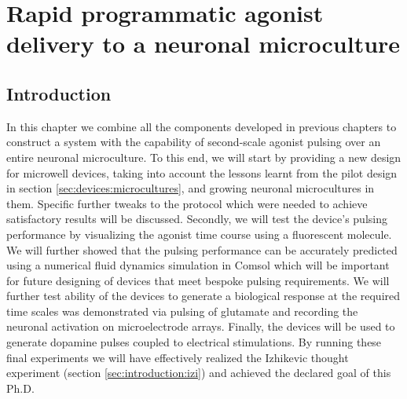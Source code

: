 \chapter{Rapid programmatic agonist delivery to a neuronal microculture}
\label{chap:microculturePulses}
\section{Introduction}
In this chapter we combine all the components developed in previous chapters to construct a system with the capability of second-scale agonist pulsing over an entire neuronal microculture. To this end, we will start by providing a new design for microwell devices, taking into account the lessons learnt from the pilot design in section \ref{sec:devices:microcultures}, and growing neuronal microcultures in them. Specific further tweaks to the protocol which were needed to achieve satisfactory results will be discussed. Secondly, we will test the device's pulsing performance by visualizing the agonist time course using a fluorescent molecule. We will further showed that the pulsing performance can be accurately predicted using a numerical fluid dynamics simulation in Comsol which will be important for future designing of devices that meet bespoke pulsing requirements. We will further test ability of the devices to generate a biological response at the required time scales was demonstrated via pulsing of glutamate and recording the neuronal activation on microelectrode arrays. Finally, the devices will be used to generate dopamine pulses coupled to electrical stimulations. By running these final experiments we will have effectively realized the Izhikevic thought experiment (section \ref{sec:introduction:izi}) and achieved the declared goal of this Ph.D.

